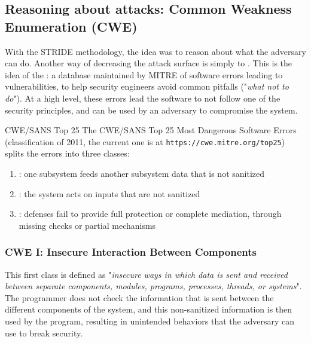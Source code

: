 \subsection{Reasoning about attacks: Common Weakness Enumeration (CWE)}
With the STRIDE methodology, the idea was to reason about what the adversary can do. Another way of decreasing the attack surface is simply to . This is the idea of the : a database maintained by MITRE of software errors leading to vulnerabilities, to help security engineers avoid common pitfalls ("\textit{what not to do}"). At a high level, these errors lead the software to not follow one of the security principles, and can be used by an adversary to compromise the system.

\begin{parag}{CWE/SANS Top 25}
    The CWE/SANS Top 25 Most Dangerous Software Errors (classification of 2011, the current one is at \texttt{https://cwe.mitre.org/top25}) splits the errors into three classes:
    \begin{enumerate}
        \item {}: one subsystem feeds another subsystem data that is not sanitized
        \item {}: the system acts on inputs that are not sanitized
        \item {}: defenses fail to provide full protection or complete mediation, through missing checks or partial mechanisms
    \end{enumerate}
\end{parag}

\subsubsection{CWE I: Insecure Interaction Between Components}
This first class is defined as "\textit{insecure ways in which data is sent and received between separate components, modules, programs, processes, threads, or systems}". The programmer does not check the information that is sent between the different components of the system, and this non-sanitized information is then used by the program, resulting in unintended behaviors that the adversary can use to break security.

